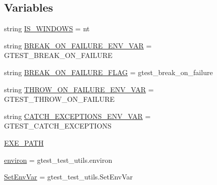\subsection*{Variables}
\begin{DoxyCompactItemize}
\item 
string \mbox{\hyperlink{namespacegoogletest-master_1_1googletest_1_1test_1_1googletest-break-on-failure-unittest_accbeb413ba2823f654b05e73e29ef1ed}{I\+S\+\_\+\+W\+I\+N\+D\+O\+WS}} = \textquotesingle{}nt\textquotesingle{}
\item 
string \mbox{\hyperlink{namespacegoogletest-master_1_1googletest_1_1test_1_1googletest-break-on-failure-unittest_a574ba48fbfc3ee899491b4d9658daa31}{B\+R\+E\+A\+K\+\_\+\+O\+N\+\_\+\+F\+A\+I\+L\+U\+R\+E\+\_\+\+E\+N\+V\+\_\+\+V\+AR}} = \textquotesingle{}G\+T\+E\+S\+T\+\_\+\+B\+R\+E\+A\+K\+\_\+\+O\+N\+\_\+\+F\+A\+I\+L\+U\+RE\textquotesingle{}
\item 
string \mbox{\hyperlink{namespacegoogletest-master_1_1googletest_1_1test_1_1googletest-break-on-failure-unittest_a936d9667f29ff13df4ed795644faf9b7}{B\+R\+E\+A\+K\+\_\+\+O\+N\+\_\+\+F\+A\+I\+L\+U\+R\+E\+\_\+\+F\+L\+AG}} = \textquotesingle{}gtest\+\_\+break\+\_\+on\+\_\+failure\textquotesingle{}
\item 
string \mbox{\hyperlink{namespacegoogletest-master_1_1googletest_1_1test_1_1googletest-break-on-failure-unittest_aa893baeafe2c754fd729cb6aaaef70d6}{T\+H\+R\+O\+W\+\_\+\+O\+N\+\_\+\+F\+A\+I\+L\+U\+R\+E\+\_\+\+E\+N\+V\+\_\+\+V\+AR}} = \textquotesingle{}G\+T\+E\+S\+T\+\_\+\+T\+H\+R\+O\+W\+\_\+\+O\+N\+\_\+\+F\+A\+I\+L\+U\+RE\textquotesingle{}
\item 
string \mbox{\hyperlink{namespacegoogletest-master_1_1googletest_1_1test_1_1googletest-break-on-failure-unittest_a82b2bf7e44d9e75f8d82ad9d63648585}{C\+A\+T\+C\+H\+\_\+\+E\+X\+C\+E\+P\+T\+I\+O\+N\+S\+\_\+\+E\+N\+V\+\_\+\+V\+AR}} = \textquotesingle{}G\+T\+E\+S\+T\+\_\+\+C\+A\+T\+C\+H\+\_\+\+E\+X\+C\+E\+P\+T\+I\+O\+NS\textquotesingle{}
\item 
\mbox{\hyperlink{namespacegoogletest-master_1_1googletest_1_1test_1_1googletest-break-on-failure-unittest_a960e6051cdd67ffaa8095d00c033e4bb}{E\+X\+E\+\_\+\+P\+A\+TH}}
\item 
\mbox{\hyperlink{namespacegoogletest-master_1_1googletest_1_1test_1_1googletest-break-on-failure-unittest_a71393e859cb92db88d7663ddcf0e929d}{environ}} = gtest\+\_\+test\+\_\+utils.\+environ
\item 
\mbox{\hyperlink{namespacegoogletest-master_1_1googletest_1_1test_1_1googletest-break-on-failure-unittest_aeff8dd0b5955763e0c4ac7727bd55ec9}{Set\+Env\+Var}} = gtest\+\_\+test\+\_\+utils.\+Set\+Env\+Var
\end{DoxyCompactItemize}


